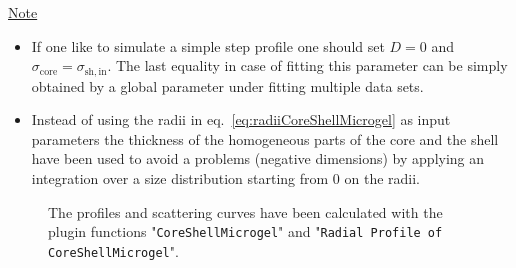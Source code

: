 \noindent
\uline{Note}
\begin{itemize}
  \item If one like to simulate a simple step profile one should set $D=0$ and
        $\sigma_\mathrm{core}=\sigma_\mathrm{sh,in}$. The last equality
        in case of fitting this parameter can be simply obtained by a global parameter
        under fitting multiple data sets.
  \item Instead of using the radii in eq.\ \ref{eq:radiiCoreShellMicrogel} as input parameters the thickness
        of the homogeneous parts of the core and the shell have been used to avoid a problems
        (negative dimensions) by applying an integration over a size distribution starting from 0 on the radii.
\end{itemize}
\begin{figure}[htb]
\captionsetup[subfigure]{position=b}
\centering
{}
\hfill
{}
\caption{The profiles and scattering curves have been calculated with the plugin functions
"\texttt{CoreShellMicrogel}" and "\texttt{Radial Profile of CoreShellMicrogel}".}
\label{fig:profile:Example_CoreShellMicrogel}
\end{figure}

